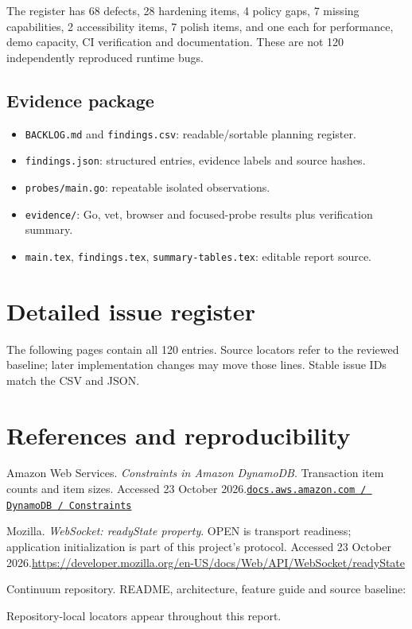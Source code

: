 \documentclass[11pt,a4paper]{article}
\begin{document}
The register has 68 defects, 28 hardening items, 4 policy gaps, 7 missing capabilities, 2 accessibility items, 7 polish items, and one each for performance, demo capacity, CI verification and documentation. These are not 120 independently reproduced runtime bugs.
\subsection{Evidence package}
\begin{itemize}
\item \texttt{BACKLOG.md} and \texttt{findings.csv}: readable/sortable planning register.
\item \texttt{findings.json}: structured entries, evidence labels and source hashes.
\item \texttt{probes/main.go}: repeatable isolated observations.
\item \texttt{evidence/}: Go, vet, browser and focused-probe results plus verification summary.
\item \texttt{main.tex}, \texttt{findings.tex}, \texttt{summary-tables.tex}: editable report source.
\end{itemize}
\section{Detailed issue register}
The following pages contain all 120 entries. Source locators refer to the reviewed baseline; later implementation changes may move those lines. Stable issue IDs match the CSV and JSON.

\clearpage

\section{References and reproducibility}
\begin{enumerate}[label={[\arabic*]}]
\item Amazon Web Services. \emph{Constraints in Amazon DynamoDB}. Transaction item counts and item sizes. Accessed 23 October 2026.\newline\href{https://docs.aws.amazon.com/amazondynamodb/latest/developerguide/Constraints.html}{\texttt{docs.aws.amazon.com / DynamoDB / Constraints}}
\item Mozilla. \emph{WebSocket: readyState property}. OPEN is transport readiness; application initialization is part of this project's protocol. Accessed 23 October 2026.\newline\url{https://developer.mozilla.org/en-US/docs/Web/API/WebSocket/readyState}
\item Continuum repository. README, architecture, feature guide and source baseline:\par
{}\par
Repository-local locators appear throughout this report.
\end{enumerate}
\end{document}
